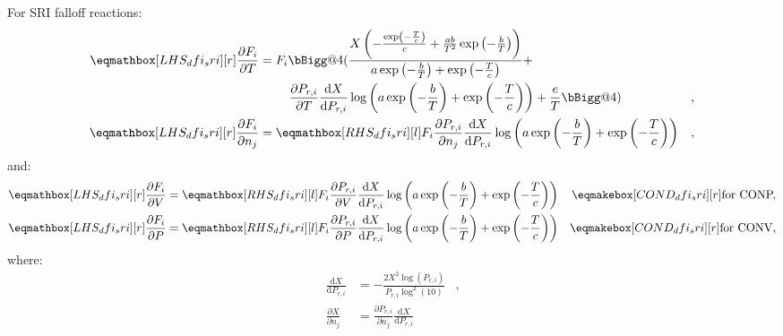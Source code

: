 \documentclass[12pt]{article}
\makeatletter
\newcommand{\conp}{CONP}
\newcommand{\conv}{CONV}
\newcommand{\dconp}{\ifmmode\text{for \conp,}\else for \conp,\fi}
\newcommand{\dconv}{\ifmmode\text{for \conv,}\else for \conv,\fi}
\newcommand{\vast}{\bBigg@{4}}
\makeatother
\begin{document}
For SRI falloff reactions:
\begin{align}
 \lhs{dfi_sri}{\frac{\partial F_{i} }{\partial T }} &= F_{i} \vast(\frac{X \left(- \frac{\operatorname{exp}\left({- \frac{T}{c}}\right)}{c} + \frac{a b}{T^{2}} \operatorname{exp}\left({- \frac{b}{T}}\right)\right)}{a \operatorname{exp}\left({- \frac{b}{T}}\right) + \operatorname{exp}\left({- \frac{T}{c}}\right)} + \nonumber \\
 & \mathindent \frac{\partial P_{r, i} }{\partial T } \frac{\text{d} X }{\text{d} P_{r, i} } \log{\left (a \operatorname{exp}\left({- \frac{b}{T}}\right) + \operatorname{exp}\left({- \frac{T}{c}}\right) \right )}+ \frac{e}{T} \vast) & , \label{e:dfi_sri_dt} \\
 \lhs{dfi_sri}{\frac{\partial F_{i} }{\partial {n_j} }} &= \rhs{dfi_sri}{F_{i} \frac{\partial P_{r, i} }{\partial {n_j} } \frac{\text{d} X }{\text{d} P_{r, i} } \log{\left (a \operatorname{exp}\left({- \frac{b}{T}}\right) + \operatorname{exp}\left({- \frac{T}{c}}\right) \right )}} & , \label{e:dfi_sri_dnj}
\end{align}
and:
\begin{subequations}
 \label{e:dfi_sri_de}
 \begin{align}
 \lhs{dfi_sri}{\frac{\partial F_{i} }{\partial V }} &= \rhs{dfi_sri}{F_{i} \frac{\partial P_{r, i} }{\partial V } \frac{\text{d} X }{\text{d} P_{r, i} } \log{\left (a \operatorname{exp}\left({- \frac{b}{T}}\right) + \operatorname{exp}\left({- \frac{T}{c}}\right) \right )}} & \cond{dfi_sri}{\dconp} \\
 \lhs{dfi_sri}{\frac{\partial F_{i} }{\partial P }} &= \rhs{dfi_sri}{F_{i} \frac{\partial P_{r, i} }{\partial P } \frac{\text{d} X }{\text{d} P_{r, i} } \log{\left (a \operatorname{exp}\left({- \frac{b}{T}}\right) + \operatorname{exp}\left({- \frac{T}{c}}\right) \right )}} & \cond{dfi_sri}{\dconv}
 \end{align}
\end{subequations}
where:
\begin{align}
 \frac{\text{d} X }{\text{d} P_{r, i} } &= - \frac{2 X^{2} \log{\left (P_{r, i} \right )}}{P_{r, i} \log^{2}{\left (10 \right )}} &, \\
 \frac{\partial X}{\partial n_j} &= \frac{\partial P_{r, i} }{\partial {n_j} } \frac{\text{d} X }{\text{d} P_{r, i} }
\end{align}
\end{document}
